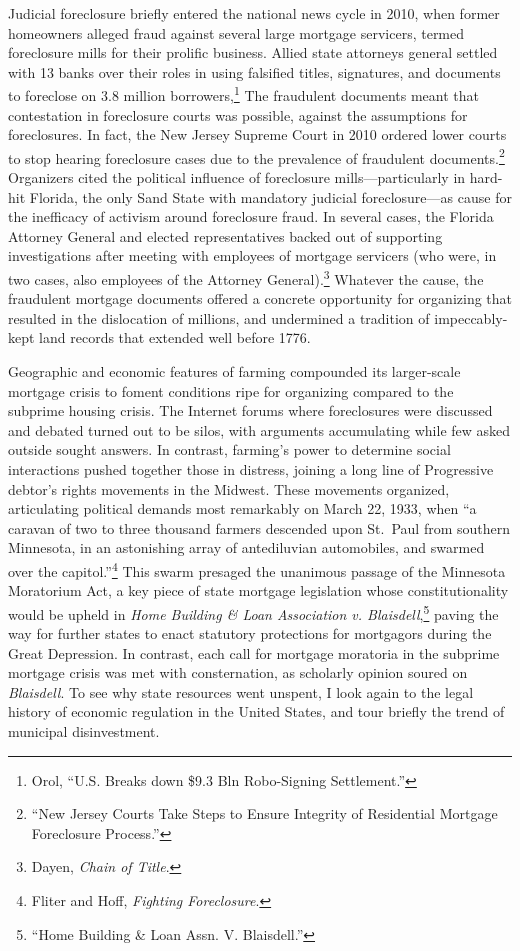 \documentclass[
]{article}
\let\rmarkdownfootnote\footnote%
\def\footnote{\protect\rmarkdownfootnote}
\begin{document}
Judicial foreclosure briefly entered the national news cycle in 2010,
when former homeowners alleged fraud against several large mortgage
servicers, termed foreclosure mills for their prolific business. Allied
state attorneys general settled with 13 banks over their roles in using
falsified titles, signatures, and documents to foreclose on 3.8 million
borrowers,\footnote{Orol, ``U.S. Breaks down \$9.3 Bln Robo-Signing
  Settlement.''} The fraudulent documents meant that contestation in
foreclosure courts was possible, against the assumptions for
foreclosures. In fact, the New Jersey Supreme Court in 2010 ordered
lower courts to stop hearing foreclosure cases due to the prevalence of
fraudulent documents.\footnote{``New Jersey Courts Take Steps to Ensure
  Integrity of Residential Mortgage Foreclosure Process.''} Organizers
cited the political influence of foreclosure mills---particularly in
hard-hit Florida, the only Sand State with mandatory judicial
foreclosure---as cause for the inefficacy of activism around foreclosure
fraud. In several cases, the Florida Attorney General and elected
representatives backed out of supporting investigations after meeting
with employees of mortgage servicers (who were, in two cases, also
employees of the Attorney General).\footnote{Dayen, \emph{Chain of
  Title}.} Whatever the cause, the fraudulent mortgage documents offered
a concrete opportunity for organizing that resulted in the dislocation
of millions, and undermined a tradition of impeccably-kept land records
that extended well before 1776.

Geographic and economic features of farming compounded its larger-scale
mortgage crisis to foment conditions ripe for organizing compared to the
subprime housing crisis. The Internet forums where foreclosures were
discussed and debated turned out to be silos, with arguments
accumulating while few asked outside sought answers. In contrast,
farming's power to determine social interactions pushed together those
in distress, joining a long line of Progressive debtor's rights
movements in the Midwest. These movements organized, articulating
political demands most remarkably on March 22, 1933, when ``a caravan of
two to three thousand farmers descended upon St.~Paul from southern
Minnesota, in an astonishing array of antediluvian automobiles, and
swarmed over the capitol.''\footnote{Fliter and Hoff, \emph{Fighting
  Foreclosure}.} This swarm presaged the unanimous passage of the
Minnesota Moratorium Act, a key piece of state mortgage legislation
whose constitutionality would be upheld in \emph{Home Building \& Loan
Association v. Blaisdell},\footnote{``Home Building \& Loan Assn. V.
  Blaisdell.''} paving the way for further states to enact statutory
protections for mortgagors during the Great Depression. In contrast,
each call for mortgage moratoria in the subprime mortgage crisis was met
with consternation, as scholarly opinion soured on \emph{Blaisdell}. To
see why state resources went unspent, I look again to the legal history
of economic regulation in the United States, and tour briefly the trend
of municipal disinvestment.
\end{document}
